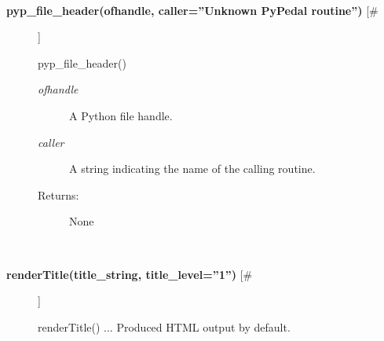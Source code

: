 \begin{description}
\begin{description}
\end{description}
\\ 

\item[\textbf{pyp\_file\_header(ofhandle, caller=''Unknown PyPedal routine'')}
 [\#]]

 pyp\_file\_header()
\begin{description}
\item[\emph{ofhandle}
] A Python file handle.
\item[\emph{caller}
] A string indicating the name of the calling routine.
\item[Returns:] None

\end{description}
\\ 

\item[\textbf{renderTitle(title\_string, title\_level=''1'')}
 [\#]]

 renderTitle() ... Produced HTML output by default.


\end{description}


